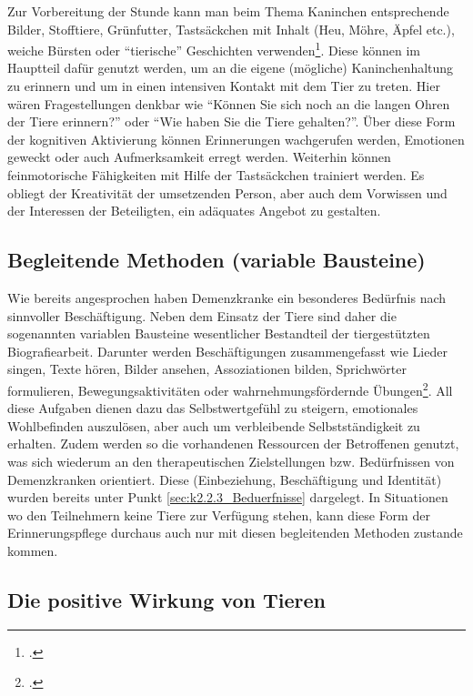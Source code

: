 Zur Vorbereitung der Stunde kann man beim Thema Kaninchen entsprechende Bilder, Stofftiere, Grünfutter, Tastsäckchen mit Inhalt (Heu, Möhre, Äpfel etc.), weiche Bürsten oder "`tierische"' Geschichten verwenden\footcite[90-95]{Giruc2011}. Diese können im Hauptteil dafür genutzt werden, um an die eigene (mögliche) Kaninchenhaltung zu erinnern und um in einen intensiven Kontakt mit dem Tier zu treten. Hier wären Fragestellungen denkbar wie "`Können Sie sich noch an die langen Ohren der Tiere erinnern?"' oder "`Wie haben Sie die Tiere gehalten?"'. Über diese Form der kognitiven Aktivierung können Erinnerungen wachgerufen werden, Emotionen geweckt oder auch Aufmerksamkeit erregt werden. Weiterhin können feinmotorische Fähigkeiten mit Hilfe der Tastsäckchen trainiert werden. Es obliegt der Kreativität der umsetzenden Person, aber auch dem Vorwissen und der Interessen der Beteiligten, ein adäquates Angebot zu gestalten.

\subsection{Begleitende Methoden (variable Bausteine)}
\label{sec:k4.4_BegleitendeMethodenVariableBausteine}

Wie bereits angesprochen haben Demenzkranke ein besonderes Bedürfnis nach sinnvoller Beschäftigung. Neben dem Einsatz der Tiere sind daher die sogenannten variablen Bausteine wesentlicher Bestandteil der tiergestützten Biografiearbeit. Darunter werden Beschäftigungen zusammengefasst wie Lieder singen, Texte hören, Bilder ansehen, Assoziationen bilden, Sprichwörter formulieren, Bewegungsaktivitäten oder wahrnehmungsfördernde Übungen\footcite[50f]{Giruc2011}. All diese Aufgaben dienen dazu das Selbstwertgefühl zu steigern, emotionales Wohlbefinden auszulösen, aber auch um verbleibende Selbstständigkeit zu erhalten. Zudem werden so die vorhandenen Ressourcen der Betroffenen genutzt, was sich wiederum an den therapeutischen Zielstellungen bzw. Bedürfnissen von Demenzkranken orientiert. Diese (Einbeziehung, Beschäftigung und Identität) wurden bereits unter Punkt \ref{sec:k2.2.3_Beduerfnisse} dargelegt.
In Situationen wo den Teilnehmern keine Tiere zur Verfügung stehen, kann diese Form der Erinnerungspflege durchaus auch nur mit diesen begleitenden Methoden zustande kommen.

\subsection{Die positive Wirkung von Tieren}
\label{sec:k4.5_DiePositiveWirkungVonTieren}


